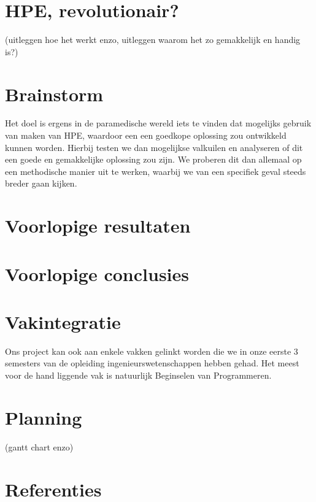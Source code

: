 \documentclass{article}
\begin{document}
\section{HPE, revolutionair?}
(uitleggen hoe het werkt enzo, uitleggen waarom het zo gemakkelijk en handig is?)

\section{Brainstorm}
Het doel is ergens in de paramedische wereld iets te vinden dat mogelijks gebruik van maken van HPE, waardoor een een goedkope oplossing zou ontwikkeld kunnen worden. Hierbij testen we dan mogelijkse valkuilen en analyseren of dit een goede en gemakkelijke oplossing zou zijn. We proberen dit dan allemaal op een methodische manier uit te werken, waarbij we van een specifiek geval steeds breder gaan kijken.
\section{Voorlopige resultaten}

\section{Voorlopige conclusies}

\section{Vakintegratie}
Ons project kan ook aan enkele vakken gelinkt worden die we in onze eerste 3 semesters van de opleiding ingenieurswetenschappen hebben gehad. Het meest voor de hand liggende vak is natuurlijk Beginselen van Programmeren.
\section{Planning}
(gantt chart enzo\texttt{})

\section{Referenties}
\end{document}
